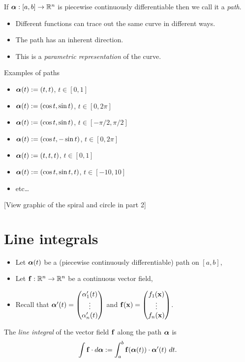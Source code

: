 \begin{definition}
    If \(\boldsymbol{\alpha}: [a,b] \to \mathbb{R}^n\) is piecewise continuously differentiable then we call it a \emph{path}.
\end{definition}




\begin{itemize}
    \item     Different functions can trace out the same curve in different ways.
    \item     The path has an inherent direction.
    \item     This is a \emph{parametric representation} of the curve.
\end{itemize}




{Examples of paths}

\begin{itemize}
    \item \(\boldsymbol{\alpha}(t):= (t,t)\), \(t\in[0,1]\)
    \item \(\boldsymbol{\alpha}(t) := (\cos t, \sin t)\), \(t\in[0,2\pi]\)
    \item \(\boldsymbol{\alpha}(t) := (\cos t, \sin t)\), \(t\in [-\pi/2,\pi/2]\)
    \item \(\boldsymbol{\alpha}(t) := (\cos t, -\sin t)\), \(t\in[0,2\pi]\)
    \item \(\boldsymbol{\alpha}(t):= (t,t,t)\), \(t\in[0,1]\)
    \item \(\boldsymbol{\alpha}(t):=(\cos t, \sin t, t)\), \(t\in [-10,10]\)
    \item etc\ldots
\end{itemize}

[View graphic of the spiral and circle in part 2]


\section{Line integrals}


\begin{itemize}
    \item Let \(\boldsymbol{\alpha}(t)\) be a (piecewise continuously differentiable) path on \([a,b]\),
    \item Let \(\mathbf{f}: \mathbb{R}^n\to\mathbb{R}^n\) be a continuous vector field,
    \item Recall that \(\boldsymbol{\alpha}'(t) = \begin{pmatrix}
              \alpha_1'(t) \\ \vdots \\ \alpha_n'(t)
          \end{pmatrix}\)
          and \(\mathbf{f}(\mathbf{x}) = \begin{pmatrix}
              f_1(\mathbf{x}) \\ \vdots \\ f_n(\mathbf{x})
          \end{pmatrix}\).
\end{itemize}
\begin{definition}
    The \emph{line integral} of the vector field \(\mathbf{f}\) along the path \(\boldsymbol{\alpha}\) is
    \[
        \int \mathbf{f} \cdot d\boldsymbol{\alpha} := \int_{a}^{b} \mathbf{f}(\boldsymbol{\alpha}(t)) \cdot \boldsymbol{\alpha}'(t) \ dt.
    \]
\end{definition}

